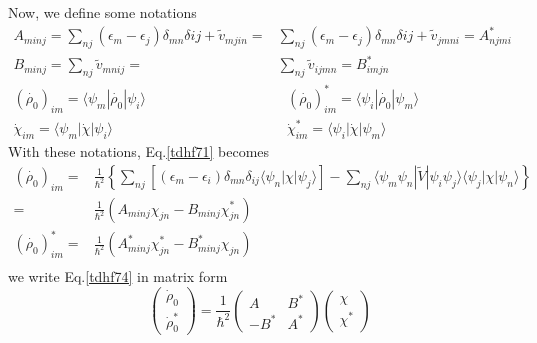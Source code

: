   Now, we define some notations
  \begin{subequations}
    \begin{align}
      A_{minj} = \sum_{nj}(\epsilon_m - \epsilon_j)\delta_{mn}\delta{ij} + \tilde{v}_{mjin} =& \sum_{nj}(\epsilon_m - \epsilon_j)\delta_{mn}\delta{ij} + \tilde{v}_{jmni} = A_{njmi}^{*}\\ \label{tdhf73}
      B_{minj} = \sum_{nj}\tilde{v}_{mnij} =& \sum_{nj}\tilde{v}_{ijmn} = B_{imjn}^* \\
      (\dot{\rho_0})_{im} = \langle \psi_m | \dot{\rho_0} | \psi_i \rangle ~~~&~~~ (\dot{\rho_0})_{im}^* = \langle \psi_i | \dot{\rho_0} | \psi_m \rangle\\
      \dot{\chi}_{im} = \langle \psi_m | \dot{\chi} | \psi_i \rangle ~~~&~~~ \dot{\chi}_{im}^* = \langle \psi_i | \dot{\chi} | \psi_m \rangle
    \end{align}
  \end{subequations}
  With these notations, Eq.\eqref{tdhf71} becomes
  \begin{equation}
    \begin{aligned}
      (\dot{\rho_0})_{im} =& \frac{1}{\hbar^2} \left\{ \sum_{nj}\left[ (\epsilon_m - \epsilon_i)\delta_{mn}\delta_{ij} \langle \psi_n | \chi | \psi_j \rangle  \right] - \sum_{nj}\langle \psi_m\psi_n | \tilde{V} | \psi_i\psi_j \rangle \langle \psi_j | \chi | \psi_n \rangle \right\}\\ \label{tdhf74}
      =& \frac{1}{\hbar^2}( A_{minj}\chi_{jn} - B_{minj}\chi_{jn}^*)\\
      (\dot{\rho_0})_{im}^* =& \frac{1}{\hbar^2}( A_{minj}^*\chi_{jn}^* - B_{minj}^*\chi_{jn})\\
    \end{aligned}
  \end{equation}
  we write Eq.\eqref{tdhf74} in matrix form
  \begin{equation}
    \left(  \label{tdhf75}
      \begin{array}{c}
        \dot{\rho}_0\\
        \dot{\rho}_0^*
      \end{array}
    \right)
    = \frac{1}{\hbar^2}
    \left(
      \begin{array}{cc}
        A    & B^*\\
        -B^* & A^*
      \end{array}
    \right)
    \left(
      \begin{array}{c}
        \chi  \\
        \chi^*
      \end{array}
    \right)
  \end{equation}
